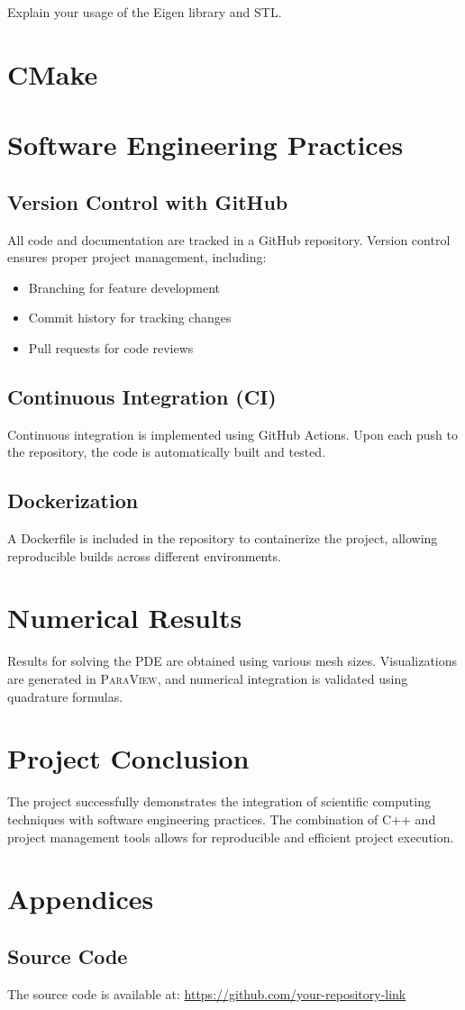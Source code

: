 \documentclass[english,10pt,a4paper]{article}
\begin{document}
Explain your usage of the Eigen library and STL.

\section{CMake}


\section{Software Engineering Practices}
\label{sec:software_practices}
\subsection{Version Control with GitHub}
All code and documentation are tracked in a GitHub repository. Version control ensures proper project management, including:
\begin{itemize}
    \item Branching for feature development
    \item Commit history for tracking changes
    \item Pull requests for code reviews
\end{itemize}

\subsection{Continuous Integration (CI)}
Continuous integration is implemented using GitHub Actions. Upon each push to the repository, the code is automatically built and tested.

\subsection{Dockerization}
A Dockerfile is included in the repository to containerize the project, allowing reproducible builds across different environments.

\section{Numerical Results}
\label{sec:numerical_results}
Results for solving the PDE are obtained using various mesh sizes. Visualizations are generated in \textsc{ParaView}, and numerical integration is validated using quadrature formulas.

\section{Project Conclusion}
\label{sec:conclusion}
The project successfully demonstrates the integration of scientific computing techniques with software engineering practices. The combination of C++ and project management tools allows for reproducible and efficient project execution.

\section*{Appendices}
\subsection*{Source Code}
The source code is available at: \url{https://github.com/your-repository-link}
\end{document}
